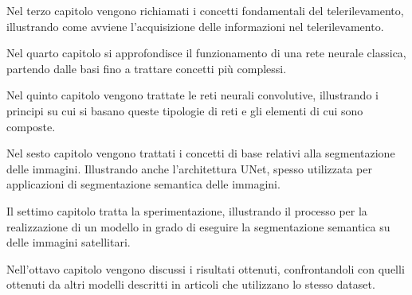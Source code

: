 Nel terzo capitolo vengono richiamati i concetti fondamentali del
telerilevamento, illustrando come avviene l'acquisizione delle informazioni nel telerilevamento.

Nel quarto capitolo si approfondisce il funzionamento di una rete neurale classica, 
partendo dalle basi fino a trattare concetti più complessi.

Nel quinto capitolo vengono trattate le reti neurali convolutive, illustrando i principi 
su cui si basano queste tipologie di reti e gli elementi di cui sono composte. 

Nel sesto capitolo vengono trattati i concetti di base relativi alla segmentazione 
delle immagini. Illustrando anche l'architettura UNet, spesso utilizzata per applicazioni 
di segmentazione semantica delle immagini.

Il settimo capitolo tratta la sperimentazione, illustrando il processo per la realizzazione di 
un modello in grado di eseguire la segmentazione semantica su delle immagini satellitari.

Nell'ottavo capitolo vengono discussi i risultati ottenuti, confrontandoli
con quelli ottenuti da altri modelli descritti in articoli che utilizzano lo stesso dataset.